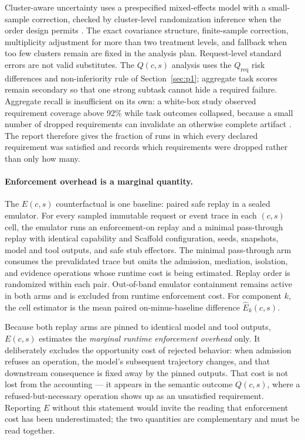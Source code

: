 \documentclass[11pt]{article}
\begin{document}
Cluster-aware uncertainty uses a prespecified mixed-effects model with a small-sample correction, checked by cluster-level randomization inference when the order design permits \cite{turner2007cluster}. The exact covariance structure, finite-sample correction, multiplicity adjustment for more than two treatment levels, and fallback when too few clusters remain are fixed in the analysis plan. Request-level standard errors are not valid substitutes. The $Q(c,s)$ analysis uses the $Q_{\mathrm{req}}$ risk differences and non-inferiority rule of Section~\ref{sec:p1}; aggregate task scores remain secondary so that one strong subtask cannot hide a required failure. Aggregate recall is insufficient on its own: a white-box study observed requirement coverage above 92\% while task outcomes collapsed, because a small number of dropped requirements can invalidate an otherwise complete artifact \cite{xue2026longcontext}. The report therefore gives the fraction of runs in which every declared requirement was satisfied and records which requirements were dropped rather than only how many.

\paragraph{Enforcement overhead is a marginal quantity.}
The $E(c,s)$ counterfactual is one baseline: paired safe replay in a sealed emulator. For every sampled immutable request or event trace in each $(c,s)$ cell, the emulator runs an enforcement-on replay and a minimal pass-through replay with identical capability and Scaffold configuration, seeds, snapshots, model and tool outputs, and safe stub effectors. The minimal pass-through arm consumes the prevalidated trace but omits the admission, mediation, isolation, and evidence operations whose runtime cost is being estimated. Replay order is randomized within each pair. Out-of-band emulator containment remains active in both arms and is excluded from runtime enforcement cost. For component $k$, the cell estimator is the mean paired on-minus-baseline difference $\widehat{E}_k(c,s)$.

Because both replay arms are pinned to identical model and tool outputs, $E(c,s)$ estimates the \textit{marginal runtime enforcement overhead} only. It deliberately excludes the opportunity cost of rejected behavior: when admission refuses an operation, the model's subsequent trajectory changes, and that downstream consequence is fixed away by the pinned outputs. That cost is not lost from the accounting --- it appears in the semantic outcome $Q(c,s)$, where a refused-but-necessary operation shows up as an unsatisfied requirement. Reporting $E$ without this statement would invite the reading that enforcement cost has been underestimated; the two quantities are complementary and must be read together.
\end{document}
